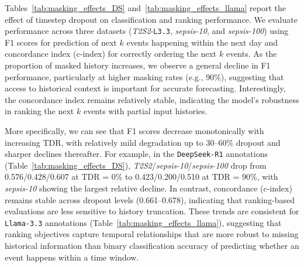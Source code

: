 Tables~\ref{tab:masking_effects_DS} and~\ref{tab:masking_effects_llama} report the effect of timestep dropout on classification and ranking performance. 
We evaluate performance across three datasets (\textit{T2S2}-\texttt{L3.3}, \textit{sepsis-10}, and \textit{sepsis-100}) using F1 scores for prediction of next \(k\) events happening within the next day and concordance index (c-index) for correctly ordering the next \(k\) events. 
As the proportion of masked history increases, we observe a general decline in F1 performance, particularly at higher masking rates (e.g., 90\%), suggesting that access to historical context is important for accurate forecasting. 
Interestingly, the concordance index remains relatively stable, indicating the model's robustness in ranking the next \(k\) events with partial input histories.

More specifically, we can see that F1 scores decrease monotonically with increasing TDR, with relatively mild degradation up to 30--60\% dropout and sharper declines thereafter. For example, in the \texttt{DeepSeek-R1} annotations (Table~\ref{tab:masking_effects_DS}), \textit{T2S2}/\textit{sepsis-10}/\textit{sepsis-100} drop from 0.576/0.428/0.607 at TDR = 0\% to 0.423/0.200/0.510 at TDR = 90\%, with \textit{sepsis-10} showing the largest relative decline. In contrast, concordance (c-index) remains stable across dropout levels (0.661--0.678), indicating that ranking-based evaluations are less sensitive to history truncation. These trends are consistent for \texttt{Llama-3.3} annotations (Table~\ref{tab:masking_effects_llama}), suggesting that ranking objectives capture temporal relationships that are more robust to missing historical information than binary classification accuracy of predicting whether an event happens within a time window.

